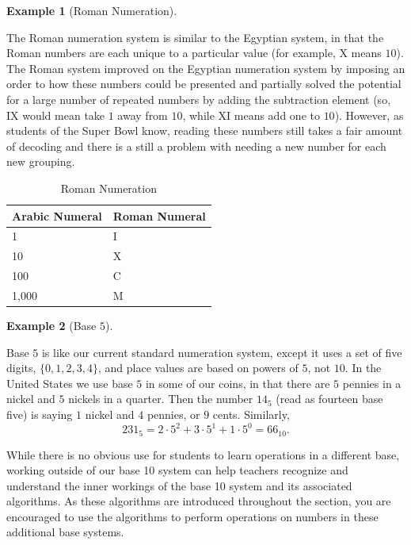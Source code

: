 \documentclass[
]{book}
\theoremstyle{definition}
\theoremstyle{definition}
\newtheorem{example}{Example}[chapter]
\theoremstyle{definition}
\theoremstyle{definition}
\theoremstyle{remark}
\begin{document}
\begin{example}[Roman Numeration]
\protect\hypertarget{exm:unlabeled-div-39}{}\label{exm:unlabeled-div-39}

The Roman numeration system is similar to the Egyptian system, in that the Roman numbers are each unique to a particular value (for example, X means \(10\)). The Roman system improved on the Egyptian numeration system by imposing an order to how these numbers could be presented and partially solved the potential for a large number of repeated numbers by adding the subtraction element (so, IX would mean take \(1\) away from \(10\), while XI means add one to \(10\)). However, as students of the Super Bowl know, reading these numbers still takes a fair amount of decoding and there is a still a problem with needing a new number for each new grouping.

\begin{table}

\caption{\label{tab:roman}Roman Numeration}
\centering
\begin{tabular}[t]{l|l}
\hline
Arabic Numeral & Roman Numeral\\
\hline
1 & I\\
\hline
10 & X\\
\hline
100 & C\\
\hline
1,000 & M\\
\hline
\end{tabular}
\end{table}

\end{example}

\begin{example}[Base $5$]
\protect\hypertarget{exm:unlabeled-div-40}{}\label{exm:unlabeled-div-40}

Base \(5\) is like our current standard numeration system, except it uses a set of five digits, \(\{0,1,2,3,4\}\), and place values are based on powers of \(5\), not \(10\). In the United States we use base \(5\) in some of our coins, in that there are \(5\) pennies in a nickel and \(5\) nickels in a quarter. Then the number \(14_{5}\) (read as fourteen base five) is saying \(1\) nickel and \(4\) pennies, or \(9\) cents. Similarly,
\[231_{5} = 2\cdot 5^2 + 3\cdot 5^1 + 1 \cdot 5^0 = 66_{10}.\]

\end{example}

While there is no obvious use for students to learn operations in a different base, working outside of our base 10 system can help teachers recognize and understand the inner workings of the base 10 system and its associated algorithms. As these algorithms are introduced throughout the section, you are encouraged to use the algorithms to perform operations on numbers in these additional base systems.
\end{document}
